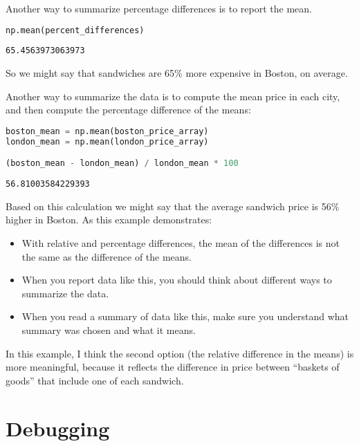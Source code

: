 Another way to summarize percentage differences is to report the mean.

\begin{lstlisting}[language=Python,style=source]
np.mean(percent_differences)
\end{lstlisting}

\begin{lstlisting}[style=output]
65.4563973063973
\end{lstlisting}

So we might say that sandwiches are 65\% more expensive in Boston, on
average.

Another way to summarize the data is to compute the mean
price in each city, and then compute the percentage difference of the
means:

\begin{lstlisting}[language=Python,style=source]
boston_mean = np.mean(boston_price_array)
london_mean = np.mean(london_price_array)

(boston_mean - london_mean) / london_mean * 100
\end{lstlisting}

\begin{lstlisting}[style=output]
56.81003584229393
\end{lstlisting}

Based on this calculation we might say that the average sandwich price
is 56\% higher in Boston. As this example demonstrates:

\begin{itemize}
\item
  With relative and percentage differences, the mean of the differences
  is not the same as the difference of the means.
\item
  When you report data like this, you should think about different ways
  to summarize the data.
\item
  When you read a summary of data like this, make sure you understand
  what summary was chosen and what it means.
\end{itemize}

In this example, I think the second option (the relative difference in
the means) is more meaningful, because it reflects the difference in
price between ``baskets of goods'' that include one of each sandwich.

\section{Debugging}\label{debugging}

